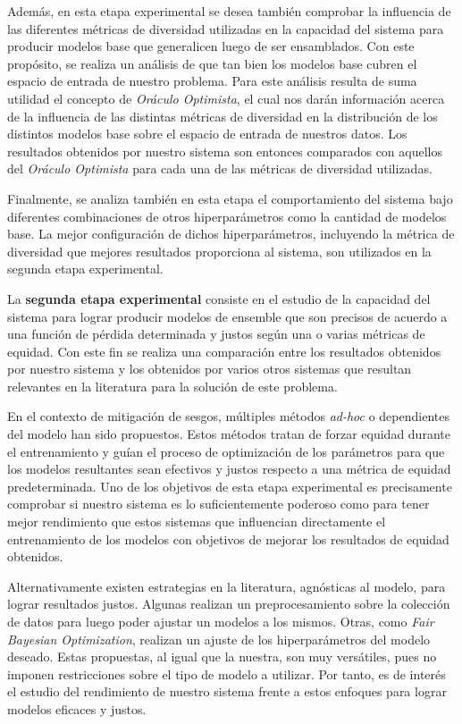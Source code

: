Además, en esta etapa experimental se desea también comprobar la influencia de las diferentes métricas de diversidad utilizadas en la capacidad del sistema para producir modelos base que generalicen luego de ser ensamblados.
Con este propósito, se realiza un análisis de que tan bien los modelos base cubren el espacio de entrada de nuestro problema.
Para este análisis resulta de suma utilidad el concepto de \emph{Oráculo Optimista}, el cual nos darán información acerca de la influencia de las distintas métricas de diversidad en la distribución de los distintos modelos base sobre el espacio de entrada de nuestros datos.
Los resultados obtenidos por nuestro sistema son entonces comparados con aquellos del \emph{Oráculo Optimista} para cada una de las métricas de diversidad utilizadas.

Finalmente, se analiza también en esta etapa el comportamiento del sistema bajo diferentes combinaciones de otros hiperparámetros como la cantidad de modelos base.
La mejor configuración de dichos hiperparámetros, incluyendo la métrica de diversidad que mejores resultados proporciona al sistema, son utilizados en la segunda etapa experimental.

La \textbf{segunda etapa experimental} consiste en el estudio de la capacidad del sistema para lograr producir modelos de ensemble que son precisos de acuerdo a una función de pérdida determinada y justos según una o varias métricas de equidad. 
Con este fin se realiza una comparación entre los resultados obtenidos por nuestro sistema y los obtenidos por varios otros sistemas que resultan relevantes en la literatura para la solución de este problema.

En el contexto de mitigación de sesgos, múltiples métodos \emph{ad-hoc} o dependientes del modelo han sido propuestos.
Estos métodos tratan de forzar equidad durante el entrenamiento y guían el proceso de optimización de los parámetros para que los modelos resultantes sean efectivos y justos respecto a una métrica de equidad predeterminada.
Uno de los objetivos de esta etapa experimental es precisamente comprobar si nuestro sistema es lo suficientemente poderoso como para tener mejor rendimiento que estos sistemas que influencian directamente el entrenamiento de los modelos con objetivos de mejorar los resultados de equidad obtenidos.

Alternativamente existen estrategias en la literatura, agnósticas al modelo, para lograr resultados justos.
Algunas realizan un preprocesamiento sobre la colección de datos para luego poder ajustar un modelos a los mismos.
Otras, como \emph{Fair Bayesian Optimization}, realizan un ajuste de los hiperparámetros del modelo deseado.
Estas propuestas, al igual que la nuestra, son muy versátiles, pues no imponen restricciones sobre el tipo de modelo a utilizar.
Por tanto, es de interés el estudio del rendimiento de nuestro sistema frente a estos enfoques para lograr modelos eficaces y justos.

